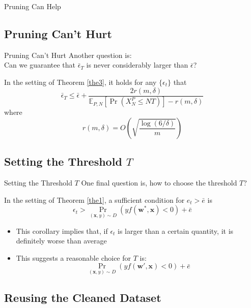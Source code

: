 \documentclass[10pt,table,mathserif]{beamer}
\begin{document}
\begin{frame}{Pruning Can Help}

\end{frame}

\subsection{Pruning Can't Hurt}

\begin{frame}{Pruning Can't Hurt}
  Another question is:\\
  Can we guarantee that $\bar{\epsilon}_T$ is never considerably larger than $\bar{\epsilon}$? \pause

  \begin{theorem}
    In the setting of Theorem \ref{the3}, it holds for any $\{\epsilon_t\}$ that
    \[\bar{\epsilon}_T \leq \bar{\epsilon} + \frac{2r(m, \delta)}{\mathbb{E}_{P,N}[\Pr (X^P_N \leq NT)]-r(m,\delta)}\]
    where
    \[r(m, \delta) = O \left(\sqrt{\frac{\log (6/\delta)}{m}}\right)\]
    \label{the5}
  \end{theorem}
\end{frame}
\subsection{Setting the Threshold $T$}

\begin{frame}{Setting the Threshold $T$}
  One final question is, how to choose the threshold $T$? \pause
  \begin{corollary}
    In the setting of Theorem \ref{the1}, a sufficient condition for $e_t > \bar{e}$ is
    \[\epsilon_t > \underset{(\mathbf{x},y)\sim D}{\Pr}(y f(\mathbf{w^*,x})<0)+\bar{e}\]
    \label{the6}
  \end{corollary} \pause
  \begin{itemize}
    \item This corollary implies that, if $\epsilon_t$ is larger than a certain quantity, it is definitely worse than average
    \item This suggests a reasonable choice for $T$ is:
        \[\underset{(\mathbf{x},y)\sim D}{\Pr}(y f(\mathbf{w',x})<0)+\bar{e}\]
  \end{itemize}
\end{frame}

\subsection{Reusing the Cleaned Dataset}
\end{document}
